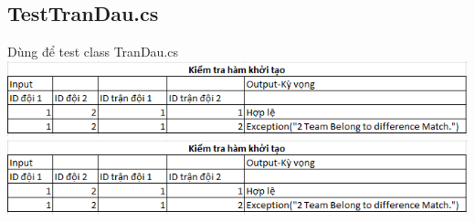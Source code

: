\documentclass[a4paper]{article}
\begin{document}
\subsection{TestTranDau.cs}
Dùng để test class TranDau.cs\\

\includegraphics[scale=0.7]{hinh14.png}  \\ 

\includegraphics[scale=0.7]{hinh14.png}\\
\end{document}
